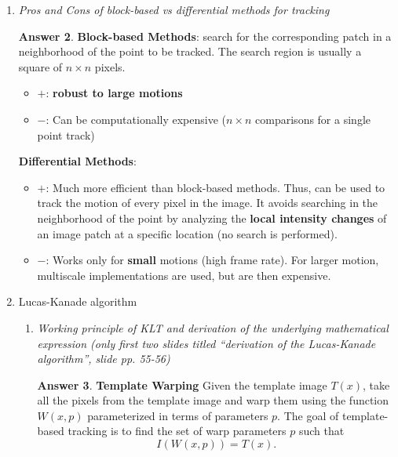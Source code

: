 \documentclass[a4paper,12 pt]{article}
\theoremstyle{definition}
\theoremstyle{remark}
\theoremstyle{definition}
\theoremstyle{definition}
\theoremstyle{definition}
\theoremstyle{definition}
\theoremstyle{remark}
\theoremstyle{remark}
\theoremstyle{definition}
\theoremstyle{definition}
\newtheorem*{answer}{Answer}
\begin{document}
\begin{enumerate}
\begin{enumerate}
\begin{answer}
\begin{itemize}
\item The vector direction and,
\item The vector length (amount of movement).
\end{itemize}
An issue could be the choice of the right patch size. It can also be applied to corner tracking.
\end{answer}
\end{enumerate}
\item \textit{Pros and Cons of block-based vs differential methods for tracking}
\begin{answer}
\textbf{Block-based Methods}: search for the corresponding patch in a neighborhood of the point to be tracked. The search region is usually a square of $n\times n$ pixels. 
\begin{itemize}
\item $+$: \textbf{robust to large motions}
\item $-$: Can be computationally expensive ($n\times n$ comparisons for a single point track)
\end{itemize}
\textbf{Differential Methods}: 
\begin{itemize}
\item $+$: Much more efficient than block-based methods. Thus, can be used to track the motion of every pixel in the image. It avoids searching in the neighborhood of the point by analyzing the \textbf{local intensity changes} of an image patch at a specific location (no search is performed).
\item $-$: Works only for \textbf{small} motions (high frame rate). For larger motion, multiscale implementations are used, but are then expensive.
\end{itemize}
\end{answer}
\item Lucas-Kanade algorithm 
\begin{enumerate}
\item \textit{Working principle of KLT and derivation of the underlying mathematical expression (only first two slides titled “derivation of the Lucas-Kanade algorithm”, slide pp. 55-56)}
\begin{answer}
\textbf{Template Warping} Given the template image $T(x)$, take all the pixels from the template image and warp them using the function $W(x,p)$ parameterized in terms of parameters $p$. The goal of template-based tracking is to find the set of warp parameters $p$ such that
\begin{equation}
I(W(x,p))=T(x).
\end{equation}

\end{answer}
\end{enumerate}
\end{enumerate}
\end{document}
